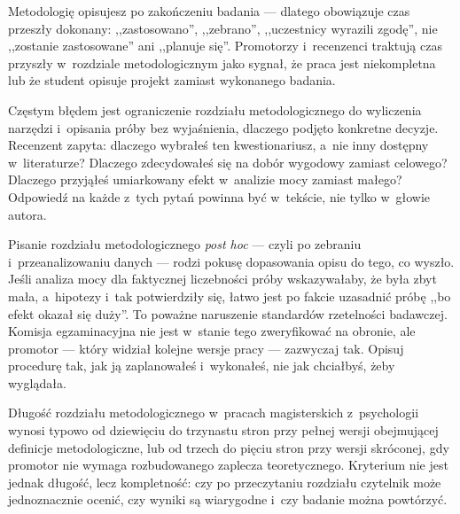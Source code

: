 \documentclass[12pt,a4paper,twoside,openany]{book}
\begin{document}
\begin{tipbox}
Metodologię opisujesz po zakończeniu badania --- dlatego obowiązuje czas przeszły dokonany: ,,zastosowano'', ,,zebrano'', ,,uczestnicy wyrazili zgodę'', nie ,,zostanie zastosowane'' ani ,,planuje się''. Promotorzy i~recenzenci traktują czas przyszły w~rozdziale metodologicznym jako sygnał, że praca jest niekompletna lub że student opisuje projekt zamiast wykonanego badania.
\end{tipbox}

Częstym błędem jest ograniczenie rozdziału metodologicznego do wyliczenia narzędzi i~opisania próby bez wyjaśnienia, dlaczego podjęto konkretne decyzje. Recenzent zapyta: dlaczego wybrałeś ten kwestionariusz, a~nie inny dostępny w~literaturze? Dlaczego zdecydowałeś się na dobór wygodowy zamiast celowego? Dlaczego przyjąłeś umiarkowany efekt w~analizie mocy zamiast małego? Odpowiedź na każde z~tych pytań powinna być w~tekście, nie tylko w~głowie autora.

\begin{warningbox}
Pisanie rozdziału metodologicznego \textit{post hoc} --- czyli po zebraniu i~przeanalizowaniu danych --- rodzi pokusę dopasowania opisu do tego, co wyszło. Jeśli analiza mocy dla faktycznej liczebności próby wskazywałaby, że była zbyt mała, a~hipotezy i~tak potwierdziły się, łatwo jest po fakcie uzasadnić próbę ,,bo efekt okazał się duży''. To poważne naruszenie standardów rzetelności badawczej. Komisja egzaminacyjna nie jest w~stanie tego zweryfikować na obronie, ale promotor --- który widział kolejne wersje pracy --- zazwyczaj tak. Opisuj procedurę tak, jak ją zaplanowałeś i~wykonałeś, nie jak chciałbyś, żeby wyglądała.
\end{warningbox}

Długość rozdziału metodologicznego w~pracach magisterskich z~psychologii wynosi typowo od dziewięciu do trzynastu stron przy pełnej wersji obejmującej definicje metodologiczne, lub od trzech do pięciu stron przy wersji skróconej, gdy promotor nie wymaga rozbudowanego zaplecza teoretycznego. Kryterium nie jest jednak długość, lecz kompletność: czy po przeczytaniu rozdziału czytelnik może jednoznacznie ocenić, czy wyniki są wiarygodne i~czy badanie można powtórzyć.
\end{document}

